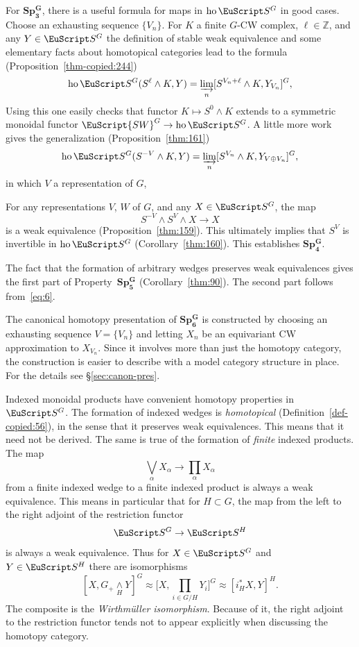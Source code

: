 \documentclass{amsart}
\theoremstyle{definition}
\theoremstyle{remark}
\newcommand{\Z}{{\mathbb Z}}
\newcommand{\spectra}{\EuScript S}
\newcommand{\swg}[1]{\EuScript {SW}^{#1}}
\DeclareMathOperator{\ho}{ho}
\newcommand{\ugspectra}[1]{\spectra^{#1}}
\newcommand{\gswdes}[1]{\mathbf{Sp^{G}_{#1}}}
\begin{document}
For $\gswdes{3}$, there is a useful formula for maps
in $\ho\ugspectra{G}$ in good cases.  Choose an exhausting sequence
$\{V_{n} \}$.  For $K$ a finite $G$-CW complex, $\ell\in\Z$, and any
$Y\in\ugspectra{G}$ the definition of stable weak equivalence and some
elementary facts about homotopical categories lead to the formula
(Proposition~\ref{thm-copied:244})
\begin{equation}
\label{eq:6}
\ho\ugspectra{G}(S^{\ell}\wedge K,Y) = \varinjlim_{n} [S^{V_{n}+\ell}\wedge
K, Y_{V_{n}}]^{G},
\end{equation}
Using this one easily checks that functor $K\mapsto S^{0}\wedge K$
extends to a symmetric monoidal functor $\swg{G}\to\ho\ugspectra{G}$.
A little more work gives the generalization
(Proposition~\ref{thm:161})
\begin{equation}
\label{eq:180}
\ho\ugspectra{G}(S^{-V}\wedge K,Y) = \varinjlim_{n} [S^{V_{n}}\wedge
K, Y_{V\oplus V_{n}}]^{G},
\end{equation}
in which $V$ a representation of $G$, 

For any representations $V$, $W$ of $G$, and any $X\in\ugspectra{G}$,
the map
\[
S^{-V} \wedge S^{V}\wedge X\to X
\]
is a weak equivalence (Proposition~\ref{thm:159}).   This ultimately
implies that $S^{V}$ is invertible in $\ho\ugspectra{G}$
(Corollary~\ref{thm:160}).  This establishes $\gswdes{4}$.

The fact that the formation of arbitrary wedges preserves weak
equivalences gives the first part of Property~$\gswdes{5}$
(Corollary~\ref{thm:90}).  The second part follows from~\eqref{eq:6}.

The canonical homotopy presentation of
$\gswdes{6}$ is constructed by choosing an exhausting sequence
$V=\{V_{n} \}$ and letting $X_{n}$ be an equivariant CW approximation
to $X_{V_{n}}$.  Since it involves more than just the homotopy
category, the construction is easier to describe with a model category
structure in place.  For the details see \S\ref{sec:canon-pres}.  

Indexed monoidal products have convenient homotopy properties in
$\ugspectra{G}$.  The formation of indexed wedges is {\em homotopical}
(Definition~\ref{def-copied:56}), in the sense that it preserves weak
equivalences.  This means that it need not be derived.  The same is
true of the formation of {\em finite} indexed products.  The map
\[
\bigvee_{\alpha} X_{\alpha} \to 
\prod_{\alpha} X_{\alpha} 
\]
from a finite indexed wedge to a finite indexed product is always a
weak equivalence.  This means in particular that for $H\subset G$, the
map from the left to the right adjoint of the restriction functor
\[
\ugspectra{G}\to \ugspectra{H}
\]
is always a weak equivalence.  Thus for $X\in\ugspectra{G}$ and
$Y\in\ugspectra{H}$ there are isomorphisms
\begin{equation}
\label{eq:21}
[X,G_{+}\underset{H}{\wedge}Y ]^{G} \approx
\big[X,\prod_{i\in G/H}Y_{i} \big]^{G} \approx
[i_{H}^{\ast} X,Y ]^{H}.
\end{equation}
The composite is the {\em Wirthm\"uller isomorphism}.  Because of it,
the right adjoint to the restriction functor tends not to appear
explicitly when discussing the homotopy category.
\end{document}
